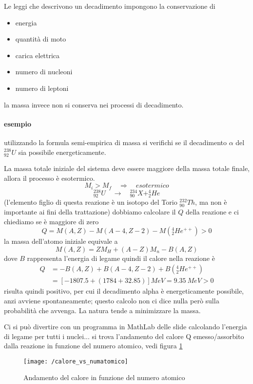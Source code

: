Le leggi che descrivono un decadimento impongono la conservazione di 
\begin{itemize}
\item energia
\item quantità di moto
\item carica elettrica
\item numero di nucleoni
\item numero di leptoni
\end{itemize}
la massa invece non si conserva nei processi di decadimento.

\paragraph{esempio} utilizzando la formula semi-empirica di massa si verifichi se il decadimento $\alpha$ del $^{238}_{92} U$ sia possibile energeticamente.

La massa totale iniziale del sistema deve essere maggiore della massa totale finale, allora il processo è esotermico.
$$ M_i > M_f \quad\Rightarrow\quad esotermico $$
\begin{equation}
^{238}_{92} U \quad\longrightarrow\quad ^{234}_{90}X + ^{4}_{2}He
\end{equation}
(l'elemento figlio di questa reazione è un isotopo del Torio $^{232}_{90}Th$, ma non è importante ai fini della trattazione)
dobbiamo calcolare il $Q$ della reazione e ci chiediamo se è maggiore di zero
\begin{equation}
Q = M(A,Z) - M(A-4,Z-2) - M(^{4}_{2}He^{++}) > 0
\end{equation}
la massa dell'atomo iniziale equivale a
\begin{equation}
M(A,Z) = Z M_H + (A-Z)M_n - B(A,Z)
\end{equation}
dove $B$ rappresenta l'energia di legame
quindi il calore nella reazione è
\begin{equation}
\begin{split}
Q  & = -B(A,Z) + B(A-4,Z-2) + B(^{4}_{2}He^{ ++ }) \\
& = [ -1807.5 + (1784 + 32.85)] MeV = \SI{9.35}{MeV} > 0
\end{split}
\end{equation}
risulta quindi positivo, per cui il decadimento alpha è energeticamente possibile, anzi avviene spontaneamente; questo calcolo non ci dice nulla però sulla probabilità che avvenga.
La natura tende a minimizzare la massa.

Ci si può divertire con un programma in MathLab delle slide calcolando l'energia di legame per tutti i nuclei...
si trova l'andamento del calore Q emesso/assorbito dalla reazione in funzione del numero atomico, vedi figura \ref{calore_vs_numatomico}
\begin{figure}[h]
\centering
\texttt{[image: /calore\_vs\_numatomico]}
\caption{Andamento del calore in funzione del numero atomico}
\label{calore_vs_numatomico}
\end{figure}

